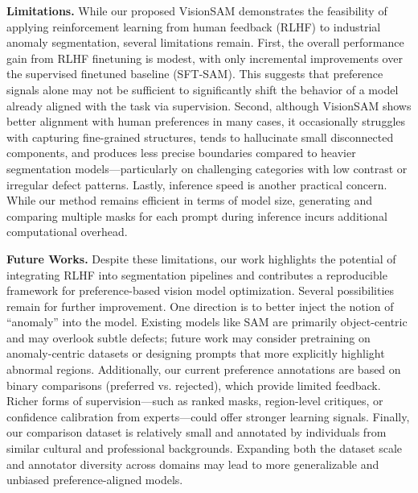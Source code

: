 \documentclass[11pt]{article}
\begin{document}

\textbf{Limitations.} While our proposed VisionSAM demonstrates the feasibility of applying reinforcement learning from human feedback (RLHF) to industrial anomaly segmentation, several limitations remain. First, the overall performance gain from RLHF finetuning is modest, with only incremental improvements over the supervised finetuned baseline (SFT-SAM). This suggests that preference signals alone may not be sufficient to significantly shift the behavior of a model already aligned with the task via supervision. Second, although VisionSAM shows better alignment with human preferences in many cases, it occasionally struggles with capturing fine-grained structures, tends to hallucinate small disconnected components, and produces less precise boundaries compared to heavier segmentation models—particularly on challenging categories with low contrast or irregular defect patterns. Lastly, inference speed is another practical concern. While our method remains efficient in terms of model size, generating and comparing multiple masks for each prompt during inference incurs additional computational overhead.

\textbf{Future Works.} Despite these limitations, our work highlights the potential of integrating RLHF into segmentation pipelines and contributes a reproducible framework for preference-based vision model optimization. Several possibilities remain for further improvement. One direction is to better inject the notion of “anomaly” into the model. Existing models like SAM are primarily object-centric and may overlook subtle defects; future work may consider pretraining on anomaly-centric datasets or designing prompts that more explicitly highlight abnormal regions. Additionally, our current preference annotations are based on binary comparisons (preferred vs. rejected), which provide limited feedback. Richer forms of supervision—such as ranked masks, region-level critiques, or confidence calibration from experts—could offer stronger learning signals. Finally, our comparison dataset is relatively small and annotated by individuals from similar cultural and professional backgrounds. Expanding both the dataset scale and annotator diversity across domains may lead to more generalizable and unbiased preference-aligned models.
\end{document}
